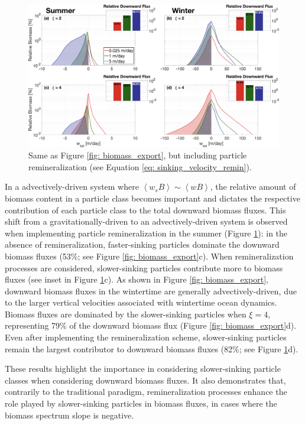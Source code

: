 \documentclass[article,linenumbers]{agujournal2019}
\begin{document}
	\begin{figure}[t!]
		\centering
		\includegraphics[width = 1\linewidth]{Fig8.png}
		\caption{Same as Figure \ref{fig: biomass_export}, but including particle remineralization (see Equation \ref{eq: sinking_velocity_remin}).}
		\label{fig: biomass_export_remin}
	\end{figure}
	In a advectively-driven system where $\left<w_sB\right> \sim \left<wB\right>$, the relative amount of biomass content in a particle class becomes important and dictates the respective contribution of each particle class to the total downward biomass fluxes. This shift from a gravitationally-driven to an advectively-driven system is observed when implementing particle remineralization in the summer (Figure \ref{fig: biomass_export_remin}): in the absence of remineralization, faster-sinking particles dominate the downward biomass fluxes (53\%; see Figure \ref{fig: biomass_export}c). When remineralization processes are considered, slower-sinking particles contribute more to biomass fluxes (see inset in Figure \ref{fig: biomass_export_remin}c). As shown in Figure \ref{fig: biomass_export}, downward biomass fluxes in the wintertime are generally advectively-driven, due to the larger vertical velocities associated with wintertime ocean dynamics. Biomass fluxes are dominated by the slower-sinking particles when $\xi =4$, representing 79\% of the downward biomass flux (Figure \ref{fig: biomass_export}d). Even after implementing the remineralization scheme, slower-sinking particles remain the largest contributor to downward biomass fluxes (82\%; see Figure \ref{fig: biomass_export_remin}d).

	These results highlight the importance in considering slower-sinking particle classes when considering downward biomass fluxes. It also demonstrates that, contrarily to the traditional paradigm, remineralization processes enhance the role played by slower-sinking particles in biomass fluxes, in cases where the biomass spectrum slope is negative. %
\end{document}

